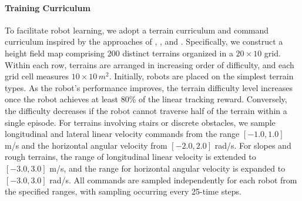 \paragraph{Training Curriculum}
To facilitate robot learning, we adopt a terrain curriculum and command curriculum inspired by the approaches of \cite{rudin2022learning}, \cite{wu2023learning}, and \cite{long2024him}. 
Specifically, we construct a height field map comprising 200 distinct terrains organized in a $20 \times 10$ grid. Within each row, terrains are arranged in increasing order of difficulty, and each grid cell measures $10 \times 10 \, m^{2}$. 
Initially, robots are placed on the simplest terrain types. As the robot's performance improves, the terrain difficulty level increases once the robot achieves at least 80\% of the linear tracking reward. Conversely, the difficulty decreases if the robot cannot traverse half of the terrain within a single episode.
For terrains involving stairs or discrete obstacles, we sample longitudinal and lateral linear velocity commands from the range $[-1.0, 1.0]$ m/s and the horizontal angular velocity from $[-2.0, 2.0]$ rad/s. For slopes and rough terrains, the range of longitudinal linear velocity is extended to $[-3.0, 3.0]$ m/s, and the range for horizontal angular velocity is expanded to $[-3.0, 3.0]$ rad/s. All commands are sampled independently for each robot from the specified ranges, with sampling occurring every 25-time steps.
